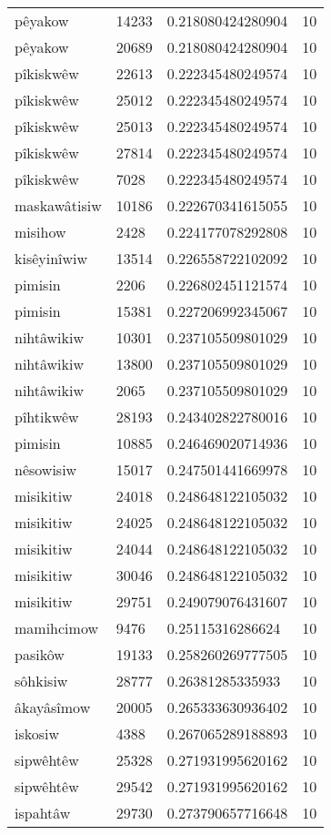\begin{longtable}{llll}
pêyakow & 14233 & 0.218080424280904 & 10 \\
pêyakow & 20689 & 0.218080424280904 & 10 \\
pîkiskwêw & 22613 & 0.222345480249574 & 10 \\
pîkiskwêw & 25012 & 0.222345480249574 & 10 \\
pîkiskwêw & 25013 & 0.222345480249574 & 10 \\
pîkiskwêw & 27814 & 0.222345480249574 & 10 \\
pîkiskwêw & 7028 & 0.222345480249574 & 10 \\
maskawâtisiw & 10186 & 0.222670341615055 & 10 \\
misihow & 2428 & 0.224177078292808 & 10 \\
kisêyinîwiw & 13514 & 0.226558722102092 & 10 \\
pimisin & 2206 & 0.226802451121574 & 10 \\
pimisin & 15381 & 0.227206992345067 & 10 \\
nihtâwikiw & 10301 & 0.237105509801029 & 10 \\
nihtâwikiw & 13800 & 0.237105509801029 & 10 \\
nihtâwikiw & 2065 & 0.237105509801029 & 10 \\
pîhtikwêw & 28193 & 0.243402822780016 & 10 \\
pimisin & 10885 & 0.246469020714936 & 10 \\
nêsowisiw & 15017 & 0.247501441669978 & 10 \\
misikitiw & 24018 & 0.248648122105032 & 10 \\
misikitiw & 24025 & 0.248648122105032 & 10 \\
misikitiw & 24044 & 0.248648122105032 & 10 \\
misikitiw & 30046 & 0.248648122105032 & 10 \\
misikitiw & 29751 & 0.249079076431607 & 10 \\
mamihcimow & 9476 & 0.25115316286624 & 10 \\
pasikôw & 19133 & 0.258260269777505 & 10 \\
sôhkisiw & 28777 & 0.26381285335933 & 10 \\
âkayâsîmow & 20005 & 0.265333630936402 & 10 \\
iskosiw & 4388 & 0.267065289188893 & 10 \\
sipwêhtêw & 25328 & 0.271931995620162 & 10 \\
sipwêhtêw & 29542 & 0.271931995620162 & 10 \\
ispahtâw & 29730 & 0.273790657716648 & 10 \\

\end{longtable}
